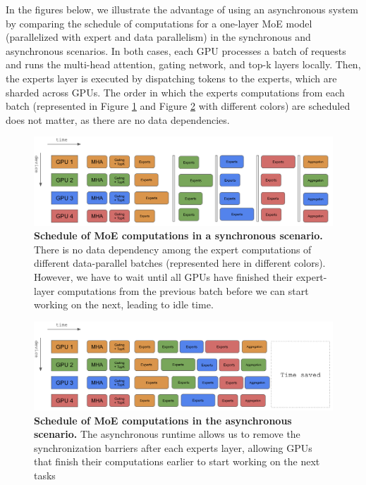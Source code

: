 In the figures below, we illustrate the advantage of using an asynchronous system by comparing the schedule of computations for a one-layer MoE model (parallelized with expert and data parallelism) in the synchronous and asynchronous scenarios. In both cases, each GPU processes a batch of requests and runs the multi-head attention, gating network, and top-k layers locally. Then, the experts layer is executed by dispatching tokens to the experts, which are sharded across GPUs. The order in which the experts computations from each batch (represented in Figure \ref{fig:asynch-demo1} and Figure \ref{fig:asynch-demo2} with different colors) are scheduled does not matter, as there are no data dependencies.

\begin{figure}[H]
    \centering
    \includegraphics[width=\linewidth]{figures/asynch_demo1.png}
    \caption{\textbf{Schedule of MoE computations in a synchronous scenario.} There is no data dependency among the expert computations of different data-parallel batches (represented here in different colors). However, we have to wait until all GPUs have finished their expert-layer computations from the previous batch before we can start working on the next, leading to idle time. }
    \label{fig:asynch-demo1}
\end{figure}

\begin{figure}[H]
    \centering
    \includegraphics[width=\linewidth]{figures/asynch_demo2.png}
    \caption{\textbf{Schedule of MoE computations in the asynchronous scenario.} The asynchronous runtime allows us to remove the synchronization barriers after each experts layer, allowing GPUs that finish their computations earlier to start working on the next tasks }
    \label{fig:asynch-demo2}
\end{figure}

